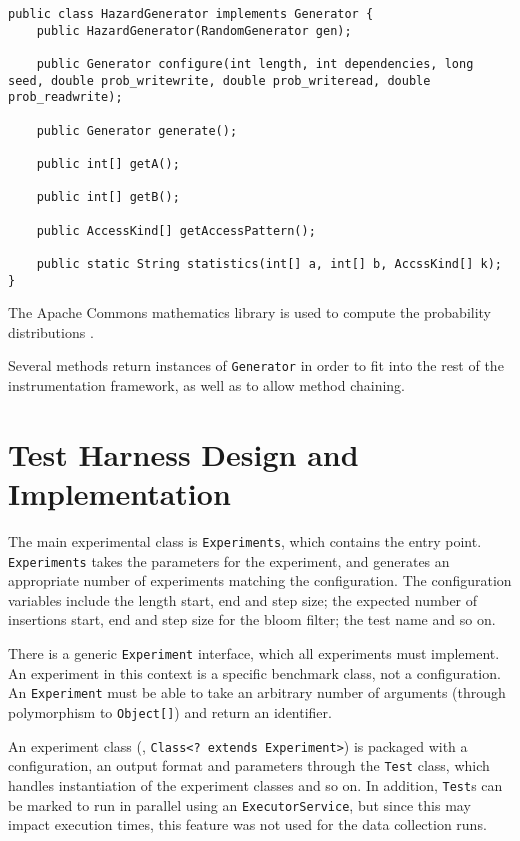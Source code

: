 	\begin{lstlisting}
public class HazardGenerator implements Generator {
	public HazardGenerator(RandomGenerator gen);
	
	public Generator configure(int length, int dependencies, long seed, double prob_writewrite, double prob_writeread, double prob_readwrite);
	
	public Generator generate();
	
	public int[] getA();
	
	public int[] getB();
	
	public AccessKind[] getAccessPattern();
	
	public static String statistics(int[] a, int[] b, AccssKind[] k);
}\end{lstlisting}

	The Apache Commons mathematics library is used to compute the probability distributions \citep{ApacheCommonsMath}.
	
	Several methods return instances of \texttt{Generator} in order to fit into the rest of the instrumentation framework, as well as to allow method chaining.

\section{Test Harness Design and Implementation} \label{sec:methodology/implementation}
The main experimental class is \texttt{Experiments}, which contains the entry point. \texttt{Experiments} takes the parameters for the experiment, and generates an appropriate number of experiments matching the configuration. The configuration variables include the length start, end and step size; the expected number of insertions start, end and step size for the bloom filter; the test name and so on.

There is a generic \texttt{Experiment} interface, which all experiments must implement. An experiment in this context is a specific benchmark class, not a configuration. An \texttt{Experiment} must be able to take an arbitrary number of arguments (through polymorphism to \texttt{Object[]}) and return an identifier.

An experiment class (\ie, \texttt{Class<? extends Experiment>}) is packaged with a configuration, an output format and parameters through the \texttt{Test} class, which handles instantiation of the experiment classes and so on. In addition, \texttt{Test}s can be marked to run in parallel using an \texttt{ExecutorService}, but since this may impact execution times, this feature was not used for the data collection runs.

